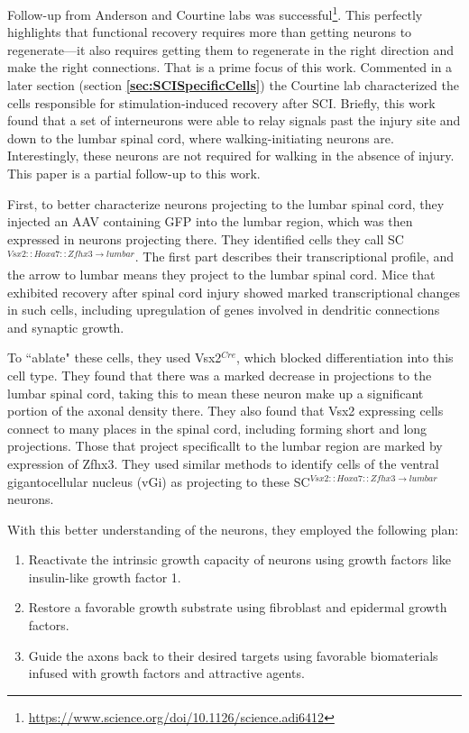 Follow-up from Anderson and Courtine labs was successful\footnote{\url{https://www.science.org/doi/10.1126/science.adi6412}}. This perfectly highlights that functional recovery requires more than getting neurons to regenerate---it also requires getting them to regenerate in the right direction and make the right connections. That is a prime focus of this work. Commented in a later section (section \textbf{\ref{sec:SCISpecificCells}}) the Courtine lab characterized the cells responsible for stimulation-induced recovery after SCI. Briefly, this work found that a set of interneurons were able to relay signals past the injury site and down to the lumbar spinal cord, where walking-initiating neurons are. Interestingly, these neurons are not required for walking in the absence of injury. This paper is a partial follow-up to this work.\newline

First, to better characterize neurons projecting to the lumbar spinal cord, they injected an AAV containing GFP into the lumbar region, which was then expressed in neurons projecting there. They identified cells they call SC$^{Vsx2::Hoxa7::Zfhx3\rightarrow lumbar}$. The first part describes their transcriptional profile, and the arrow to lumbar means they project to the lumbar spinal cord. Mice that exhibited recovery after spinal cord injury showed marked transcriptional changes in such cells, including upregulation of genes involved in dendritic connections and synaptic growth.\newline

To ``ablate" these cells, they used Vsx2$^{Cre}$, which blocked differentiation into this cell type. They found that there was a marked decrease in projections to the lumbar spinal cord, taking this to mean these neuron make up a significant portion of the axonal density there. They also found that Vsx2 expressing cells connect to many places in the spinal cord, including forming short and long projections. Those that project specificallt to the lumbar region are marked by expression of Zfhx3. They used similar methods to identify cells of the ventral gigantocellular nucleus (vGi) as projecting to these SC$^{Vsx2::Hoxa7::Zfhx3\rightarrow lumbar}$ neurons.\newline

With this better understanding of the neurons, they employed the following plan: 
\begin{enumerate}
    \itemsep 0em
    \item Reactivate the intrinsic growth capacity of neurons using growth factors like insulin-like growth factor 1. 
    \item Restore a favorable growth substrate using fibroblast and epidermal growth factors. 
    \item Guide the axons back to their desired targets using favorable biomaterials infused with growth factors and attractive agents. 
\end{enumerate}

